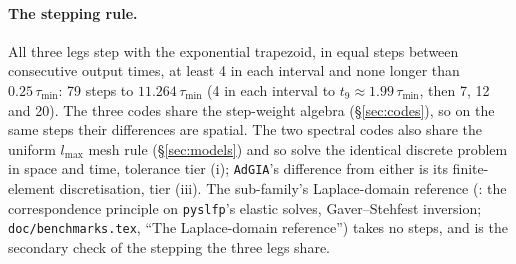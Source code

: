 \documentclass[11pt]{article}
\numberwithin{equation}{section}
\newcommand{\code}[1]{\texttt{#1}}
\begin{document}
\paragraph{The stepping rule.} All three legs step with the exponential
trapezoid, in equal steps between consecutive output times, at least 4 in
each interval and none longer than $0.25\,\tau_{\min}$: 79 steps to
$11.264\,\tau_{\min}$ (4 in each interval to $t_9\approx1.99\,\tau_{\min}$,
then 7, 12 and 20). The three codes share the step-weight algebra
(\S\ref{sec:codes}), so on the same steps their differences are spatial.
The two spectral codes also share the uniform $l_{\max}$ mesh rule
(\S\ref{sec:models}) and so solve the identical discrete problem in space
and time, tolerance tier (i); \code{AdGIA}'s difference from either is its
finite-element discretisation, tier (iii). The sub-family's Laplace-domain
reference (: the correspondence principle on
\code{pyslfp}'s elastic solves, Gaver--Stehfest inversion;
\code{doc/benchmarks.tex}, ``The Laplace-domain reference'') takes no
steps, and is the secondary check of the stepping the three legs share.
\end{document}
